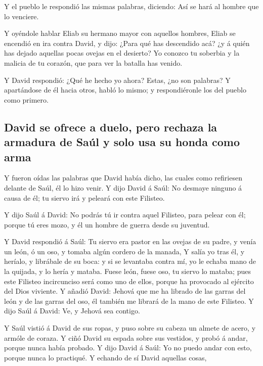  Y el pueblo le respondió las mismas palabras, diciendo:
Así se hará al hombre que lo venciere.

 Y oyéndole hablar Eliab su hermano mayor con aquellos
hombres, Eliab se encendió en ira contra David, y dijo: ¿Para qué has
descendido acá? ¿y á quién has dejado aquellas pocas ovejas en el
desierto? Yo conozco tu soberbia y la malicia de tu corazón, que para
ver la batalla has venido.

 Y David respondió: ¿Qué he hecho yo ahora? Estas, ¿no son
palabras?  Y apartándose de él hacia otros, habló lo mismo;
y respondiéronle los del pueblo como primero.

\hypertarget{david-se-ofrece-a-duelo-pero-rechaza-la-armadura-de-sauxfal-y-solo-usa-su-honda-como-arma}{%
\subsection{David se ofrece a duelo, pero rechaza la armadura de Saúl y
solo usa su honda como
arma}\label{david-se-ofrece-a-duelo-pero-rechaza-la-armadura-de-sauxfal-y-solo-usa-su-honda-como-arma}}

 Y fueron oídas las palabras que David había dicho, las
cuales como refiriesen delante de Saúl, él lo hizo venir. 
Y dijo David á Saúl: No desmaye ninguno á causa de él; tu siervo irá y
peleará con este Filisteo.

 Y dijo Saúl á David: No podrás tú ir contra aquel
Filisteo, para pelear con él; porque tú eres mozo, y él un hombre de
guerra desde su juventud.

 Y David respondió á Saúl: Tu siervo era pastor en las
ovejas de su padre, y venía un león, ó un oso, y tomaba algún cordero de
la manada,  Y salía yo tras él, y heríalo, y librábale de
su boca: y si se levantaba contra mí, yo le echaba mano de la quijada, y
lo hería y mataba.  Fuese león, fuese oso, tu siervo lo
mataba; pues este Filisteo incircunciso será como uno de ellos, porque
ha provocado al ejército del Dios viviente.  Y añadió
David: Jehová que me ha librado de las garras del león y de las garras
del oso, él también me librará de la mano de este Filisteo. Y dijo Saúl
á David: Ve, y Jehová sea contigo.

 Y Saúl vistió á David de sus ropas, y puso sobre su cabeza
un almete de acero, y armóle de coraza.  Y ciñó David su
espada sobre sus vestidos, y probó á andar, porque nunca había probado.
Y dijo David á Saúl: Yo no puedo andar con esto, porque nunca lo
practiqué. Y echando de sí David aquellas cosas,

